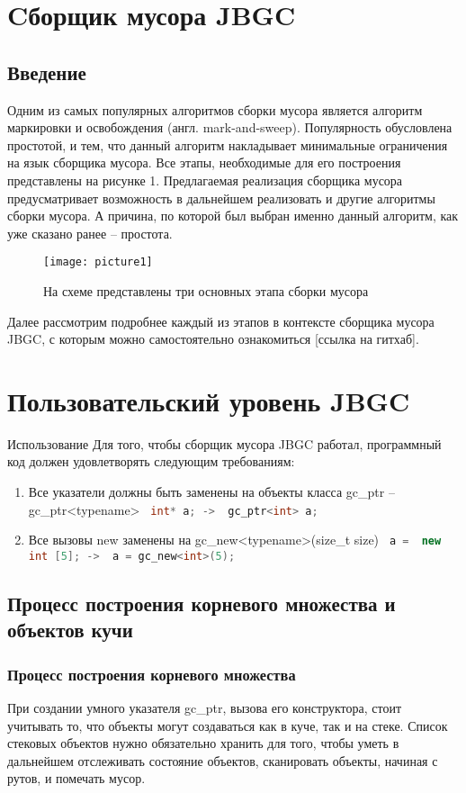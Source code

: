

\section{Cборщик мусора JBGC}
\subsection{Введение}
Одним из самых популярных алгоритмов сборки мусора является  алгоритм маркировки и освобождения (англ. mark-and-sweep). Популярность обусловлена простотой, и тем, что данный алгоритм накладывает минимальные ограничения на язык сборщика мусора. Все этапы, необходимые для его построения представлены на рисунке 1.  Предлагаемая реализация сборщика мусора предусматривает возможность в дальнейшем реализовать и другие алгоритмы сборки мусора.  А причина, по которой был выбран именно данный алгоритм, как уже сказано ранее -- простота.


\begin{figure}[h!]
	\centering
	\texttt{[image: picture1]}
	\caption{На схеме представлены три основных этапа сборки мусора}
	\centering
\end{figure}

Далее рассмотрим подробнее каждый из этапов в контексте сборщика мусора JBGC,  с которым можно самостоятельно ознакомиться [ссылка на гитхаб].


\section{Пользовательский уровень JBGC}
Использование
Для того, чтобы сборщик мусора JBGC работал, программный код должен удовлетворять следующим требованиям:
\begin{enumerate}
\item Все указатели  должны быть заменены на  объекты класса gc\_ptr -- gc\_ptr<typename> \lstinline[language= C++]{ int* a; ->  gc_ptr<int> a;}
\item Все вызовы new заменены на gc\_new<typename>(size\_t size) \lstinline[language= C++]{ a =  new int [5]; ->  a = gc_new<int>(5);}
\end {enumerate}

\subsection{Процесс построения корневого множества и объектов кучи}
\subsubsection{Процесс построения корневого множества}
При создании умного указателя gc\_ptr, вызова его конструктора, стоит учитывать то, что объекты могут создаваться как в куче, так и на стеке. Список стековых объектов  нужно обязательно хранить для того, чтобы уметь в дальнейшем отслеживать состояние объектов, сканировать объекты, начиная с рутов, и помечать мусор. 


